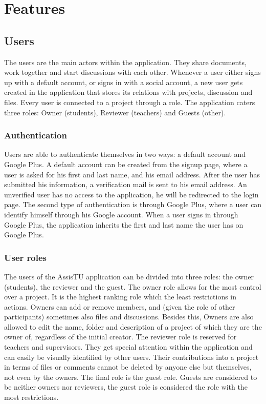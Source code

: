 \chapter{Features}
\section{Users}

The users are the main actors within the application. They share documents, work together and start discussions with each other. Whenever
a user either signs up with a default account, or signs in with a social account, a new user gets created in the application that stores its relations
with projects, discussion and files. Every user is connected to a project through a role. The application caters three roles: Owner (students), 
Reviewer (teachers) and Guests (other).

\subsection{Authentication}

Users are able to authenticate themselves in two ways: a default account and Google Plus. A default account can be created from the signup page, where a 
user is asked for his first and last name, and his email address. After the user has submitted his information, a verification mail is sent to his email address. An unverified user has no access to the application, he will be redirected to the login page. The second type of authentication is through
Google Plus, where a user can identify himself through his Google account. When a user signs in through Google Plus, the application inherits
the first and last name the user has on Google Plus.

\subsection{User roles}

The users of the AssisTU application can be divided into three roles: the owner (students), the reviewer and the guest. The owner role allows for the most control over a project. It is the highest ranking role which the least restrictions in actions.
Owners can add or remove members, and (given the role of other participants) sometimes also files and discussions. Besides this, Owners are also allowed to edit the name, folder and description of a project of which they are the owner of, regardless of the initial creator. 
The reviewer role is reserved for teachers and supervisors. They get special attention within the application and can easily be visually identified by other users. Their contributions into a project in terms of files or comments cannot be deleted by anyone else but themselves, not even by the owners. 
The final role is the guest role. Guests are considered to be neither owners nor reviewers, the guest role is considered the role with the most restrictions.

